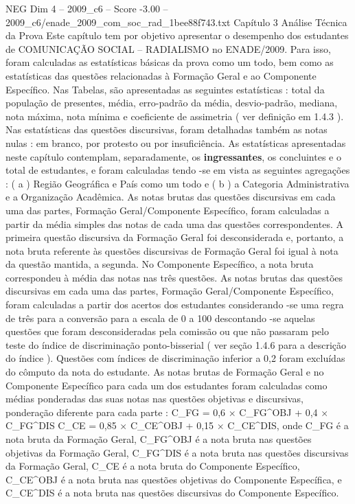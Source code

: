 \begin{textsample}{NEG Dim 4 – 2009\_c6 – Score -3.00 – 2009\_c6/enade\_2009\_com\_soc\_rad\_1bee88f743.txt}  \label{ex:f4_neg_035}
Capítulo 3 Análise Técnica da Prova Este capítulo tem por objetivo apresentar o desempenho dos estudantes de COMUNICAÇÃO SOCIAL – RADIALISMO no ENADE/2009.
Para isso, foram calculadas as estatísticas básicas da prova como um todo, bem como as estatísticas das questões relacionadas à Formação Geral e ao Componente Específico.
Nas Tabelas, são apresentadas as seguintes estatísticas : total da população de presentes, média, erro-padrão da média, desvio-padrão, mediana, nota máxima, nota mínima e coeficiente de assimetria ( ver definição em 1.4.3 ).
Nas estatísticas das questões discursivas, foram detalhadas também as notas nulas : em branco, por protesto ou por insuficiência.
As estatísticas apresentadas neste capítulo contemplam, separadamente, os \textbf{ingressantes}, os concluintes e o total de estudantes, e foram calculadas tendo -se em vista as seguintes agregações : ( a ) Região Geográfica e País como um todo e ( b ) a Categoria Administrativa e a Organização Acadêmica.
As notas brutas das questões discursivas em cada uma das partes, Formação Geral/Componente Específico, foram calculadas a partir da média simples das notas de cada uma das questões correspondentes.
A primeira questão discursiva da Formação Geral foi desconsiderada e, portanto, a nota bruta referente às questões discursivas de Formação Geral foi igual à nota da questão mantida, a segunda.
No Componente Específico, a nota bruta correspondeu à média das notas nas três questões.
As notas brutas das questões discursivas em cada uma das partes, Formação Geral/Componente Específico, foram calculadas a partir dos acertos dos estudantes considerando -se uma regra de três para a conversão para a escala de 0 a 100 descontando -se aquelas questões que foram desconsideradas pela comissão ou que não passaram pelo teste do índice de discriminação ponto-bisserial ( ver seção 1.4.6 para a descrição do índice ).
Questões com índices de discriminação inferior a 0,2 foram excluídas do cômputo da nota do estudante.
As notas brutas de Formação Geral e no Componente Específico para cada um dos estudantes foram calculadas como médias ponderadas das suas notas nas questões objetivas e discursivas, ponderação diferente para cada parte : C\_FG = 0,6 × C\_FG\textasciicircum{}OBJ + 0,4 × C\_FG\textasciicircum{}DIS C\_CE = 0,85 × C\_CE\textasciicircum{}OBJ + 0,15 × C\_CE\textasciicircum{}DIS, onde C\_FG é a nota bruta da Formação Geral, C\_FG\textasciicircum{}OBJ é a nota bruta nas questões objetivas da Formação Geral, C\_FG\textasciicircum{}DIS é a nota bruta nas questões discursivas da Formação Geral, C\_CE é a nota bruta do Componente Específico, C\_CE\textasciicircum{}OBJ é a nota bruta nas questões objetivas do Componente Específica, e C\_CE\textasciicircum{}DIS é a nota bruta nas questões discursivas do Componente Específico.

\end{textsample}
